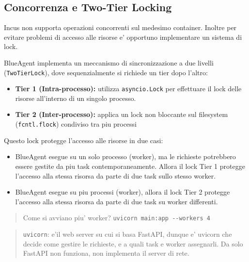 \subsection{Concorrenza e Two-Tier
Locking}\label{concorrenza-e-two-tier-locking}

Incus non supporta operazioni concorrenti sul medesimo container.
Inoltre per evitare problemi di accesso alle risorse e' opportuno
implementare un sistema di lock.

BlueAgent implementa un meccanismo di sincronizzazione a due livelli
(\passthrough{\lstinline!TwoTierLock!}), dove sequenzialmente si
richiede un tier dopo l'altro:

\begin{itemize}
\tightlist
\item
  \textbf{Tier 1 (Intra-processo):} utilizza
  \passthrough{\lstinline!asyncio.Lock!} per effettuare il lock delle
  risorse all'interno di un singolo processo.
\item
  \textbf{Tier 2 (Inter-processo):} applica un lock non bloccante sul
  filesystem (\passthrough{\lstinline!fcntl.flock!}) condiviso tra piu
  processi
\end{itemize}

Questo lock protegge l'accesso alle risorse in due casi:

\begin{itemize}
\tightlist
\item
  BlueAgent esegue su un solo processo (worker), ma le richieste
  potrebbero essere gestite da piu task contemporaneamente. Allora il
  lock Tier 1 protegge l'accesso alla stessa risorsa da parte di due
  task sullo stesso worker.
\item
  BlueAgent esegue su piu processi (worker), allora il lock Tier 2
  protegge l'accesso alla stessa risorsa da parte di due task su worker
  differenti.
\end{itemize}

\begin{quote}
Come si avviano piu' worker?
\passthrough{\lstinline!uvicorn main:app --workers 4!}
\end{quote}

\begin{quote}
\passthrough{\lstinline!uvicorn!}: e'il web server su cui si basa
FastAPI, dunque e' uvicorn che decide come gestire le richieste, e a
quali task e worker assegnarli. Da solo FastAPI non funziona, non
implementa il server di rete.
\end{quote}

